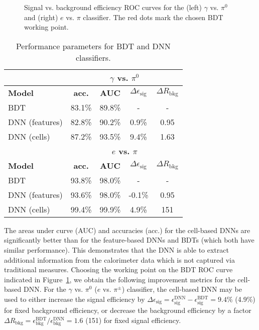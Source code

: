 \begin{figure}[!t]
    \centering
    \caption{Signal vs. background efficiency ROC curves for the (left) $\gamma$ vs. $\pi^0$ and (right) $e$ vs. $\pi$ classifier. The red dots mark the chosen BDT working point.}
    \label{ROCs}
\end{figure}

\begin{table}[!ht]
    \centering
    \begin{tabular}[!t]{l|cccc}
        \hline
        & \multicolumn{4}{c}{\textbf{$\gamma$ vs. $\pi^0$}}\\
        \hline
        \textbf{Model} & \textbf{acc.} &  \textbf{AUC} & \textbf{$\Delta \epsilon_{\mathrm{sig}}$} & \textbf{$\Delta R_{\mathrm{bkg}}$} \\
        \hline
        \centering
        BDT & 83.1\% & 89.8\% & - & - \\
        DNN (features) & 82.8\% & 90.2\% & 0.9\% & 0.95 \\
        DNN (cells) & 87.2\% & 93.5\% & 9.4\% & 1.63 \\
        \hline
        & \multicolumn{4}{c}{\textbf{$e$ vs. $\pi$}}\\
        \hline
        \textbf{Model} & \textbf{acc.} &  \textbf{AUC} & \textbf{$\Delta \epsilon_{\mathrm{sig}}$} & \textbf{$\Delta R_{\mathrm{bkg}}$} \\
        \hline
        \centering
        BDT & 93.8\% & 98.0\% & - & - \\
        DNN (features) & 93.6\% & 98.0\% & -0.1\% & 0.95 \\
        DNN (cells) & 99.4\% & 99.9\% & 4.9\% & 151 \\
        \hline
    \end{tabular}
    \caption{Performance parameters for BDT and DNN classifiers.} 
    \label{AUCs}
\end{table}

The areas under curve (AUC) and accuracies (acc.) for the cell-based DNNs are significantly better than for the feature-based DNNs and BDTs (which both have similar performance). This demonstrates that the DNN is able to extract additional information from the calorimeter data which is not captured via traditional measures. Choosing the working point on the BDT ROC curve indicated in Figure~\ref{ROCs}, we obtain the following improvement metrics for the cell-based DNN. For the $\gamma$ vs. $\pi^0$ ($e$ vs. $\pi^\pm$) classifier, the cell-based DNN may be used to either increase the signal efficiency by $\Delta \epsilon_{\mathrm{sig}} = \epsilon_{\mathrm{sig}}^{\mathrm{DNN}} - \epsilon_{\mathrm{sig}}^{\mathrm{BDT}}=9.4$\% (4.9\%) for fixed background efficiency, or decrease the background efficiency by a factor $\Delta R_{\mathrm{bkg}} = \epsilon_{\mathrm{bkg}}^{\mathrm{BDT}} / \epsilon_{\mathrm{bkg}}^{\mathrm{DNN}}= 1.6$ (151) for fixed signal efficiency.

